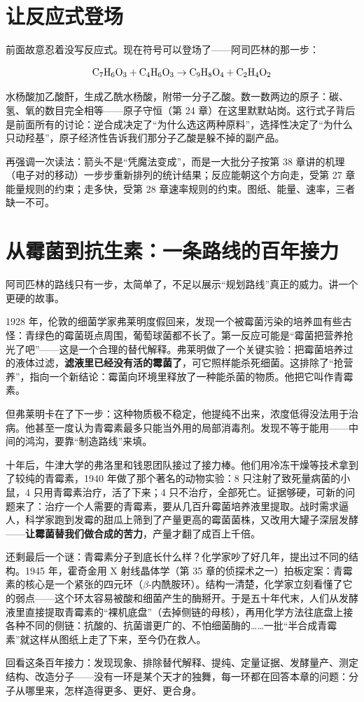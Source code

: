 \section{让反应式登场}

前面故意忍着没写反应式。现在符号可以登场了——阿司匹林的那一步：

\[\mathrm{C_7H_6O_3} + \mathrm{C_4H_6O_3} \rightarrow \mathrm{C_9H_8O_4} + \mathrm{C_2H_4O_2}\]

水杨酸加乙酸酐，生成乙酰水杨酸，附带一分子乙酸。数一数两边的原子：碳、氢、氧的数目完全相等——原子守恒（第 24 章）在这里默默站岗。这行式子背后是前面所有的讨论：逆合成决定了“为什么选这两种原料”，选择性决定了“为什么只动羟基”，原子经济性告诉我们那分子乙酸是躲不掉的副产品。

再强调一次读法：箭头不是“凭魔法变成”，而是一大批分子按第 38 章讲的机理（电子对的移动）一步步重新排列的统计结果；反应能朝这个方向走，受第 27 章能量规则的约束；走多快，受第 28 章速率规则的约束。图纸、能量、速率，三者缺一不可。

\section{从霉菌到抗生素：一条路线的百年接力}

阿司匹林的路线只有一步，太简单了，不足以展示“规划路线”真正的威力。讲一个更硬的故事。

\begin{zhengju}
1928 年，伦敦的细菌学家弗莱明度假回来，发现一个被霉菌污染的培养皿有些古怪：青绿色的霉菌斑点周围，葡萄球菌都不长了。第一反应可能是“霉菌把营养抢光了吧”——这是一个合理的替代解释。弗莱明做了一个关键实验：把霉菌培养过的液体过滤，\textbf{滤液里已经没有活的霉菌了}，可它照样能杀死细菌。这排除了“抢营养”，指向一个新结论：霉菌向环境里释放了一种能杀菌的物质。他把它叫作青霉素。

但弗莱明卡在了下一步：这种物质极不稳定，他提纯不出来，浓度低得没法用于治病。他甚至一度认为青霉素最多只能当外用的局部消毒剂。发现不等于能用——中间的鸿沟，要靠“制造路线”来填。

十年后，牛津大学的弗洛里和钱恩团队接过了接力棒。他们用冷冻干燥等技术拿到了较纯的青霉素，1940 年做了那个著名的动物实验：8 只注射了致死量病菌的小鼠，4 只用青霉素治疗，活了下来；4 只不治疗，全部死亡。证据够硬，可新的问题来了：治疗一个人需要的青霉素，要从几百升霉菌培养液里提取。战时需求逼人，科学家跑到发霉的甜瓜上筛到了产量更高的霉菌菌株，又改用大罐子深层发酵——\textbf{让霉菌替我们做合成的苦力}，产量才翻了成百上千倍。

还剩最后一个谜：青霉素分子到底长什么样？化学家吵了好几年，提出过不同的结构。1945 年，霍奇金用 X 射线晶体学（第 35 章的侦探术之一）拍板定案：青霉素的核心是一个紧张的四元环（$\beta$-内酰胺环）。结构一清楚，化学家立刻看懂了它的弱点——这个环太容易被酸和细菌产生的酶掰开。于是五十年代末，人们从发酵液里直接提取青霉素的“裸机底盘”（去掉侧链的母核），再用化学方法往底盘上接各种不同的侧链：抗酸的、抗菌谱更广的、不怕细菌酶的……一批“半合成青霉素”就这样从图纸上走了下来，至今仍在救人。

回看这条百年接力：发现现象、排除替代解释、提纯、定量证据、发酵量产、测定结构、改造分子——没有一环是某个天才的独舞，每一环都在回答本章的问题：分子从哪里来，怎样造得更多、更好、更合身。
\end{zhengju}

